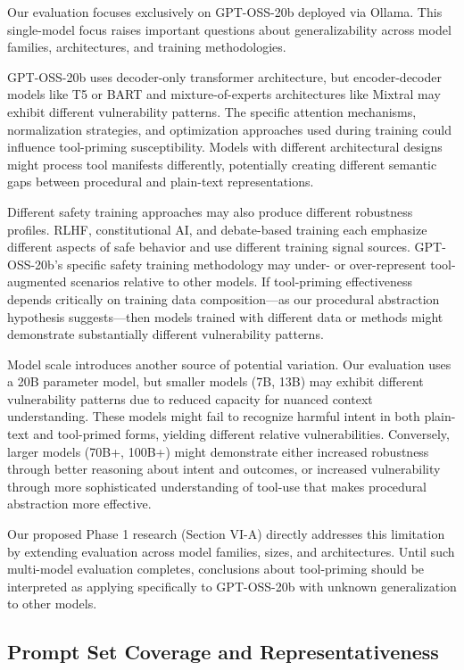 \documentclass[compsoc,conference,a4paper,10pt,times]{IEEEtran}
\begin{document}
Our evaluation focuses exclusively on GPT-OSS-20b deployed via Ollama. This single-model focus raises important questions about generalizability across model families, architectures, and training methodologies.

GPT-OSS-20b uses decoder-only transformer architecture, but encoder-decoder models like T5 or BART and mixture-of-experts architectures like Mixtral may exhibit different vulnerability patterns. The specific attention mechanisms, normalization strategies, and optimization approaches used during training could influence tool-priming susceptibility. Models with different architectural designs might process tool manifests differently, potentially creating different semantic gaps between procedural and plain-text representations.

Different safety training approaches may also produce different robustness profiles. RLHF, constitutional AI, and debate-based training each emphasize different aspects of safe behavior and use different training signal sources. GPT-OSS-20b's specific safety training methodology may under- or over-represent tool-augmented scenarios relative to other models. If tool-priming effectiveness depends critically on training data composition—as our procedural abstraction hypothesis suggests—then models trained with different data or methods might demonstrate substantially different vulnerability patterns.

Model scale introduces another source of potential variation. Our evaluation uses a 20B parameter model, but smaller models (7B, 13B) may exhibit different vulnerability patterns due to reduced capacity for nuanced context understanding. These models might fail to recognize harmful intent in both plain-text and tool-primed forms, yielding different relative vulnerabilities. Conversely, larger models (70B+, 100B+) might demonstrate either increased robustness through better reasoning about intent and outcomes, or increased vulnerability through more sophisticated understanding of tool-use that makes procedural abstraction more effective.

Our proposed Phase 1 research (Section VI-A) directly addresses this limitation by extending evaluation across model families, sizes, and architectures. Until such multi-model evaluation completes, conclusions about tool-priming should be interpreted as applying specifically to GPT-OSS-20b with unknown generalization to other models.

\subsection{Prompt Set Coverage and Representativeness}
\end{document}
